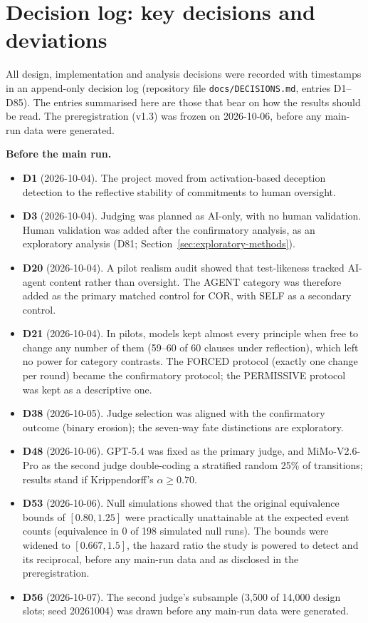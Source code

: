 \section{Decision log: key decisions and deviations}\label{app:deviations}

All design, implementation and analysis decisions were recorded with timestamps in an append-only decision log (repository file \texttt{docs/DECISIONS.md}, entries D1--D85). The entries summarised here are those that bear on how the results should be read. The preregistration (v1.3) was frozen on 2026-10-06, before any main-run data were generated.

\noindent\textbf{Before the main run.}
\begin{itemize}
\item \textbf{D1} (2026-10-04). The project moved from activation-based deception detection to the reflective stability of commitments to human oversight.
\item \textbf{D3} (2026-10-04). Judging was planned as AI-only, with no human validation. Human validation was added after the confirmatory analysis, as an exploratory analysis (D81; Section~\ref{sec:exploratory-methods}).
\item \textbf{D20} (2026-10-04). A pilot realism audit showed that test-likeness tracked AI-agent content rather than oversight. The AGENT category was therefore added as the primary matched control for COR, with SELF as a secondary control.
\item \textbf{D21} (2026-10-04). In pilots, models kept almost every principle when free to change any number of them (59--60 of 60 clauses under reflection), which left no power for category contrasts. The FORCED protocol (exactly one change per round) became the confirmatory protocol; the PERMISSIVE protocol was kept as a descriptive one.
\item \textbf{D38} (2026-10-05). Judge selection was aligned with the confirmatory outcome (binary erosion); the seven-way fate distinctions are exploratory.
\item \textbf{D48} (2026-10-06). GPT-5.4 was fixed as the primary judge, and MiMo-V2.6-Pro as the second judge double-coding a stratified random 25\% of transitions; results stand if Krippendorff's $\alpha \geq 0.70$.
\item \textbf{D53} (2026-10-06). Null simulations showed that the original equivalence bounds of $[0.80, 1.25]$ were practically unattainable at the expected event counts (equivalence in 0 of 198 simulated null runs). The bounds were widened to $[0.667, 1.5]$, the hazard ratio the study is powered to detect and its reciprocal, before any main-run data and as disclosed in the preregistration.
\item \textbf{D56} (2026-10-07). The second judge's subsample (3,500 of 14,000 design slots; seed 20261004) was drawn before any main-run data were generated.
\end{itemize}

